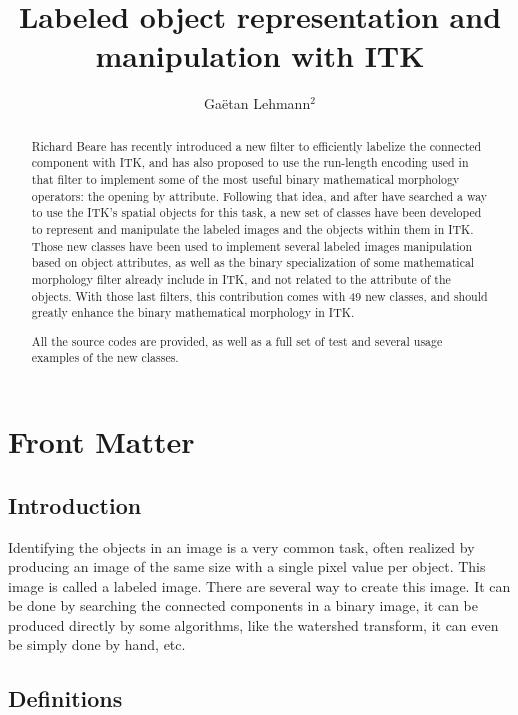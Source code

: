 \documentclass{InsightArticle}
\title{Labeled object representation and manipulation with ITK}
\author{Ga\"etan Lehmann{$^2$}}
\begin{document}
\maketitle

\ifhtml
\chapter*{Front Matter\label{front}}
\fi


\begin{abstract}
\noindent

Richard Beare has recently introduced a new filter to efficiently labelize the
connected component with ITK, and has also proposed to use the run-length
encoding used in that filter to implement some of the most useful binary
mathematical morphology operators: the opening by attribute.
Following that idea, and after have searched a way to use the ITK's spatial
objects for this task, a new set of classes have been developed to represent and
manipulate the labeled images and the objects within them in ITK.
Those new classes have been used to implement several labeled images
manipulation based on object attributes, as well as the binary specialization of
some mathematical morphology filter already include in ITK, and not related to
the attribute of the objects. With those last filters, this contribution comes
with 49 new classes, and should greatly enhance the binary mathematical
morphology in ITK.

All the source codes are provided, as well as a full set of test and several
usage examples of the new classes.

\end{abstract}

\tableofcontents

\section{Introduction}

Identifying the objects in an image is a very common task, often realized by
producing an image of the same size with a single pixel value per object. This
image is called a labeled image. There are several way to create this image. It
can be done by searching the connected components in a binary image, it can be
produced directly by some algorithms, like the watershed transform, it can even
be simply done by hand, etc.

\section{Definitions}
\end{document}
